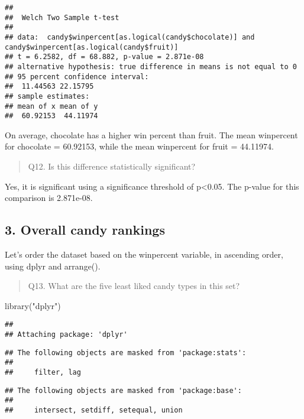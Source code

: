 \documentclass[
]{article}
\newenvironment{Shaded}{\begin{snugshade}}{\end{snugshade}}
\newcommand{\FunctionTok}[1]{\textcolor[rgb]{0.00,0.00,0.00}{#1}}
\newcommand{\NormalTok}[1]{#1}
\newcommand{\StringTok}[1]{\textcolor[rgb]{0.31,0.60,0.02}{#1}}
\begin{document}
\begin{verbatim}
## 
##  Welch Two Sample t-test
## 
## data:  candy$winpercent[as.logical(candy$chocolate)] and candy$winpercent[as.logical(candy$fruit)]
## t = 6.2582, df = 68.882, p-value = 2.871e-08
## alternative hypothesis: true difference in means is not equal to 0
## 95 percent confidence interval:
##  11.44563 22.15795
## sample estimates:
## mean of x mean of y 
##  60.92153  44.11974
\end{verbatim}

On average, chocolate has a higher win percent than fruit. The mean
winpercent for chocolate = 60.92153, while the mean winpercent for fruit
= 44.11974.

\begin{quote}
Q12. Is this difference statistically significant?
\end{quote}

Yes, it is significant using a significance threshold of p\textless0.05.
The p-value for this comparison is 2.871e-08.

\hypertarget{overall-candy-rankings}{%
\subsection{3. Overall candy rankings}\label{overall-candy-rankings}}

Let's order the dataset based on the winpercent variable, in ascending
order, using dplyr and arrange().

\begin{quote}
Q13. What are the five least liked candy types in this set?
\end{quote}

\begin{Shaded}
\begin{Highlighting}[]
\FunctionTok{library}\NormalTok{(}\StringTok{"dplyr"}\NormalTok{)}
\end{Highlighting}
\end{Shaded}

\begin{verbatim}
## 
## Attaching package: 'dplyr'
\end{verbatim}

\begin{verbatim}
## The following objects are masked from 'package:stats':
## 
##     filter, lag
\end{verbatim}

\begin{verbatim}
## The following objects are masked from 'package:base':
## 
##     intersect, setdiff, setequal, union
\end{verbatim}
\end{document}
